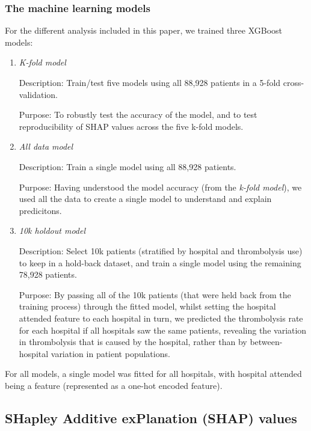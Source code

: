 \subsubsection{The machine learning models}

For the different analysis included in this paper, we trained three XGBoost models:
\begin{enumerate}
    \item {\emph{K-fold model}}
    
    Description: Train/test five models using all 88,928 patients in a 5-fold cross-validation.
    
    Purpose: To robustly test the accuracy of the model, and to test reproducibility of SHAP values across the five k-fold models.
    
    \item {\emph{All data model}}
    
    Description: Train a single model using all 88,928 patients.
    
    Purpose: Having understood the model accuracy (from the \emph{k-fold model}), we used all the data to create a single model to understand and explain predicitons.
    
    \item {\emph{10k holdout model}}

    Description: Select 10k patients (stratified by hospital and thrombolysis use) to keep in a hold-back dataset, and train a single model using the remaining 78,928 patients. 
    
    Purpose: By passing all of the 10k patients (that were held back from the training process) through the fitted model, whilst setting the hospital attended feature to each hospital in turn, we predicted the thrombolysis rate for each hospital if all hospitals saw the same patients, revealing the variation in thrombolysis that is caused by the hospital, rather than by between-hospital variation in patient populations.
\end{enumerate}

For all models, a single model was fitted for all hospitals, with hospital attended being a feature (represented as a one-hot encoded feature).

\subsection{SHapley Additive exPlanation (SHAP) values}

